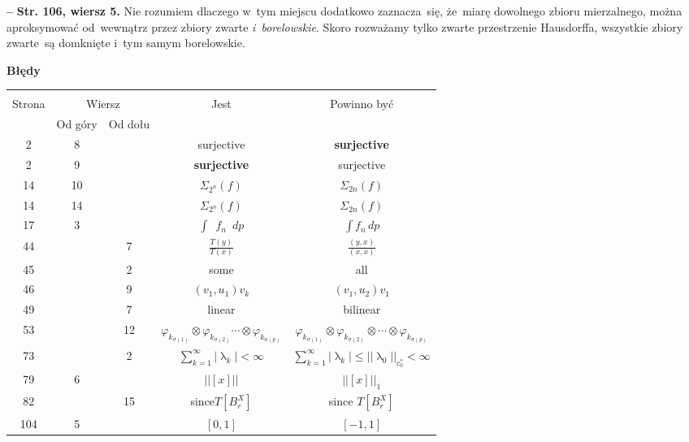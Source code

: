 \documentclass[a4paper,11pt]{article}
\newcommand{\fr}{\frac}
\newcommand{\la}{\uplambda}
\newcommand{\vp}{\varphi}
\newcommand{\si}{\sigma}
\newcommand{\Si}{\Sigma}
\newcommand{\ot}{\otimes}
\newcommand{\Sum}{\sum\limits}
\newcommand{\Int}{\int\limits}
\newcommand{\IntCaD}[2] { \Int #1 \, d#2 } %
\providecommand{\absj}[1]{\lvert #1 \rvert}
\newcommand{\norm}[1]{\left|\left| #1 \right|\right|}
\newcommand{\tb}{\textbf}
\newcommand{\noi}{\noindent}
\newcommand{\start}{\noi \tb{--} {}}
\newcommand{\StrWg}[2]{\tb{Str. #1, wiersz #2.}}
\newcommand{\Center}[1]{\begin{center} #1 \end{center}}
\newcommand{\CenterTB}[1]{\Center{\tb{#1}}}
\begin{document}
\start \StrWg{106}{5} Nie rozumiem dlaczego w~tym miejscu dodatkowo
zaznacza~się, że~miarę dowolnego zbioru mierzalnego, można
aproksymować od~wewnątrz przez zbiory zwarte \emph{i~borelowskie}.
Skoro rozważamy tylko zwarte przestrzenie Hausdorffa, wszystkie zbiory
zwarte~są domknięte i~tym samym borelowskie.

\newpage



\CenterTB{Błędy}
\begin{center}
  \begin{tabular}{|c|c|c|c|c|}
    \hline
    & \multicolumn{2}{c|}{} & & \\
    Strona & \multicolumn{2}{c|}{Wiersz}& Jest & Powinno być \\ \cline{2-3}
    & Od góry & Od dołu &  &  \\ \hline
    2 & 8 & & surjective & \tb{surjective} \\
    2 & 9 & & \tb{surjective} & surjective \\
    14 & 10 & & $\Si_{ 2^{ n } }( f )$ & $\Si_{ 2 n }( f )$ \\
    14 & 14 & & $\Si_{ 2^{ n } }( f )$ & $\Si_{ 2 n }( f )$ \\
    17 & 3 & & $\int \;\: f_{ n } \;\: dp$ & $\IntCaD{ f_{ n } }{ p }$ \\
    44 & & 7 & $\fr{ T( y ) }{ T( x ) }$ & $\fr{ ( y, x ) }{ ( x, x ) }$ \\
    45 & & 2 & some & all \\
    46 & & 9 & $(v_{ 1 }, u_{ 1 } ) v_{ k }$ & $(v_{ 1 }, u_{ 2 } )
                                               v_{ 1 }$ \\
    49 & & 7 & linear & bilinear \\
    53 & & 12 & $\vp_{ k_{ \si( 1 ) } } \ot \vp_{ k_{ \si( 2 ) } } \cdots
                \ot \vp_{ k_{ n( p ) } }$
           & $\vp_{ k_{ \si( 1 ) } } \ot \vp_{ k_{ \si( 2 ) } } \ot \cdots
             \ot \vp_{ k_{ \si( p ) } }$ \\
    73 & & 2 & $\Sum_{ k = 1 }^{ \infty } \absj{ \la_{ k } } < \infty$
           & $\Sum_{ k = 1 }^{ \infty } \absj{ \la_{ k } } \leq
             \norm{ \la_{ 0 } }_{ c_{ 0 }^{ * } } < \infty$ \\
    79 & 6 & & $\norm{ [x] }$ & $\norm{ [x] }_{ 1 }$ \\
    82 & & 15 & since$T[ B_{ r }^{ X } ]$ & since $T[ B_{ r }^{ X } ]$ \\
    104 & 5 & & $[ 0, 1 ]$ & $[ -1, 1 ]$ \\

\end{tabular}
\end{center}
\end{document}
